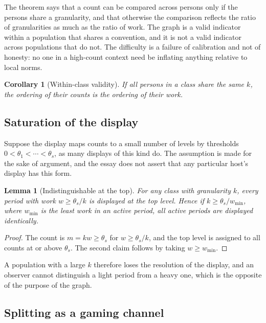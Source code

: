 \documentclass[11pt]{article}
\theoremstyle{plain}
\newtheorem{lemma}[theorem]{Lemma}
\newtheorem{corollary}[theorem]{Corollary}
\theoremstyle{definition}
\theoremstyle{remark}
\begin{document}
The theorem says that a count can be compared across persons only if the persons share a granularity, and that otherwise the comparison reflects the ratio of granularities as much as the ratio of work. The graph is a valid indicator within a population that shares a convention, and it is not a valid indicator across populations that do not. The difficulty is a failure of calibration and not of honesty: no one in a high-count context need be inflating anything relative to local norms.

\begin{corollary}[Within-class validity]\label{cor:within}
If all persons in a class share the same $k$, the ordering of their counts is the ordering of their work.
\end{corollary}

\subsection{Saturation of the display}

Suppose the display maps counts to a small number of levels by thresholds $0<\theta_1<\cdots<\theta_s$, as many displays of this kind do. The assumption is made for the sake of argument, and the essay does not assert that any particular host's display has this form.

\begin{lemma}[Indistinguishable at the top]\label{lem:topcode}
For any class with granularity $k$, every period with work $w\ge\theta_s/k$ is displayed at the top level. Hence if $k\ge\theta_s/w_{\min}$, where $w_{\min}$ is the least work in an active period, all active periods are displayed identically.
\end{lemma}

\begin{proof}
The count is $m=kw\ge\theta_s$ for $w\ge\theta_s/k$, and the top level is assigned to all counts at or above $\theta_s$. The second claim follows by taking $w\ge w_{\min}$. \qedhere
\end{proof}

A population with a large $k$ therefore loses the resolution of the display, and an observer cannot distinguish a light period from a heavy one, which is the opposite of the purpose of the graph.

\subsection{Splitting as a gaming channel}
\end{document}
